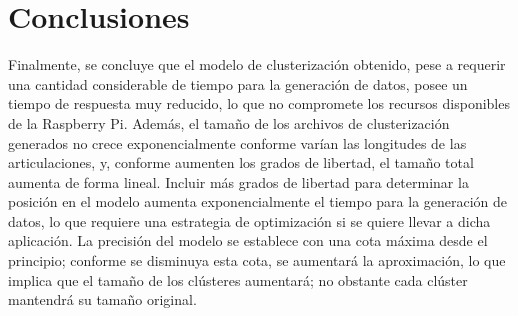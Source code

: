 \section{Conclusiones}

Finalmente, se concluye que el modelo de clusterización obtenido, pese a requerir una cantidad considerable de tiempo para la generación de datos, posee un tiempo de respuesta muy reducido, lo que no compromete los recursos disponibles de la Raspberry Pi. Además, el tamaño de los archivos de clusterización generados no crece exponencialmente conforme varían las longitudes de las articulaciones, y, conforme aumenten los grados de libertad, el tamaño total aumenta de forma lineal. Incluir más grados de libertad para determinar la posición en el modelo aumenta exponencialmente el tiempo para la generación de datos, lo que requiere una estrategia de optimización si se quiere llevar a dicha aplicación. La precisión del modelo se establece con una cota máxima desde el principio; conforme se disminuya esta cota, se aumentará la aproximación, lo que implica que el tamaño de los clústeres aumentará; no obstante cada clúster mantendrá su tamaño original.